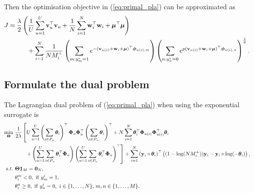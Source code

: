 Then the optimisation objective in (\ref{eq:primal_pla}) can be approximated as
\begin{equation*}
\begin{aligned}
J 
&\approx 
\frac{\lambda}{2} \left( \frac{1}{U} \sum_{u=1}^U \mathbf{v}_u^\top \mathbf{v}_u + \frac{1}{N} \sum_{i=1}^N \mathbf{w}_i^\top \mathbf{w}_i + \bm{\mu}^\top \bm{\mu} \right) \\
& \hspace{3em}
  + \sum_{i=1}^N \frac{1}{N M_i^+} 
    \left( \sum_{m: y_m^i = 1} e^{-(\mathbf{v}_{u(i)} + \mathbf{w}_i + \bm{\mu})^\top \bm{\phi}_{u(i),m}} \right)
    \left( \sum_{n: y_n^i = 0} e^{p (\mathbf{v}_{u(i)} + \mathbf{w}_i + \bm{\mu})^\top \bm{\phi}_{u(i),n}} \right)^\frac{1}{p}.
\end{aligned}
\end{equation*}


\subsection{Formulate the dual problem}
The Lagrangian dual problem of (\ref{eq:primal_pla}) when using the exponential surrogate is
\begin{equation}
\label{eq:dual_pla}
\begin{aligned}
\min_{\Thetabm} \ & \frac{1}{2 \lambda} \left[
     U \sum_{u=1}^U \left( \sum_{i \in P_u} \thetabm_i \right)^\top \Phibm_u \Phibm_u^\top \left( \sum_{i \in P_u} \thetabm_i \right)^\top
   + N \sum_{i=1}^N \thetabm_i^\top \Phibm_{u(i)} \Phibm_{u(i)}^\top \thetabm_i \right. \\
& \hspace{2em} \left.
   + \left( \sum_{u=1}^U \sum_{i \in P_u} \thetabm_i^\top \Phibm_u \right)
     \left( \sum_{u=1}^U \sum_{i \in P_u} \thetabm_i^\top \Phibm_u \right)^\top \right]
   + \sum_{i=1}^N \left( \y_i \circ \thetabm_i \right)^\top 
     \left( (1 - \log(N M_i^+)) \y_i - \y_i \circ \log(-\thetabm_i) \right), \\
s.t. \ 
& \Thetabm \one_M = \zero_N, \\
&\theta_i^m < 0, \ \mathrm{if} \ y_m^i = 1, \\
&\theta_i^n \ge 0, \ \mathrm{if} \ y_n^i = 0, \ i \in \{1,\dots,N\}, \, m,n \in \{1,\dots,M\}.
\end{aligned}
\end{equation}
